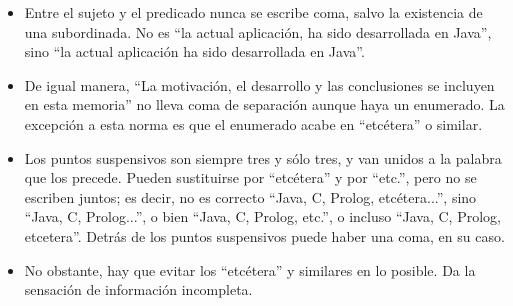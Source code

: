 \begin{shaded}
\begin{itemize}
    \item Entre el sujeto y el predicado nunca se escribe coma, salvo la existencia de una subordinada. No es ``la actual aplicación, ha sido desarrollada en Java'', sino ``la actual aplicación ha sido desarrollada en Java''.
    \item De igual manera, ``La motivación, el desarrollo y las conclusiones se incluyen en esta memoria'' no lleva coma de separación aunque haya un enumerado. La excepción a esta norma es que el enumerado acabe en ``etcétera'' o similar.
    \item Los puntos suspensivos son siempre tres y sólo tres, y van unidos a la palabra que los precede. Pueden sustituirse por ``etcétera'' y por ``etc.'', pero no se escriben juntos; es decir, no es correcto ``Java, C, Prolog, etcétera...'', sino ``Java, C, Prolog...'', o bien ``Java, C, Prolog, etc.'', o incluso ``Java, C, Prolog, etcetera''. Detrás de los puntos suspensivos puede haber una coma, en su caso.
    \item No obstante, hay que evitar los ``etcétera'' y similares en lo posible. Da la sensación de información incompleta.
\end{itemize}
\end{shaded}